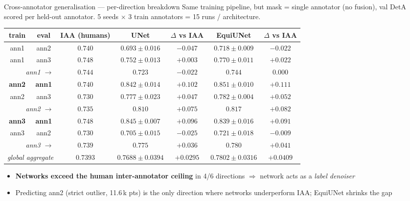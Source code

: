 \documentclass[10pt,aspectratio=169]{beamer}
\newcommand{\hilite}[1]{\textbf{\color{blue!60!black}#1}}
\begin{document}
\begin{frame}{Cross-annotator generalisation --- per-direction breakdown}
  Same training pipeline, but mask = single annotator (no fusion), val DetA scored
  per held-out annotator. 5 seeds $\times$ 3 train annotators = 15 runs / architecture.

  \vspace{2mm}
  \centering
  \scriptsize
  \begin{tabular}{c c c c c c c}
    \toprule
    train     & eval      & IAA (humans) & UNet                  & $\Delta$ vs IAA & EquiUNet              & $\Delta$ vs IAA \\
    \midrule
    ann1      & ann2      & $0.740$ & $0.693 \pm 0.016$           & $-0.047$        & $0.718 \pm 0.009$     & $-0.022$        \\
    ann1      & ann3      & $0.748$ & $0.752 \pm 0.013$           & $+0.003$        & $0.770 \pm 0.011$     & $+0.022$        \\
    \multicolumn{2}{r}{\emph{ann1 $\to$}} & $0.744$ & $0.723$ & $-0.022$ & $0.744$ & $0.000$ \\
    \midrule
    \hilite{ann2} & \hilite{ann1} & $0.740$ & \hilite{$0.842 \pm 0.014$} & \hilite{$+0.102$} & \hilite{$0.851 \pm 0.010$} & \hilite{$+0.111$} \\
    ann2      & ann3      & $0.730$ & $0.777 \pm 0.023$           & $+0.047$        & $0.782 \pm 0.004$     & $+0.052$        \\
    \multicolumn{2}{r}{\emph{ann2 $\to$}} & $0.735$ & \hilite{$0.810$} & \hilite{$+0.075$} & \hilite{$0.817$} & \hilite{$+0.082$} \\
    \midrule
    \hilite{ann3} & \hilite{ann1} & $0.748$ & \hilite{$0.845 \pm 0.007$} & \hilite{$+0.096$} & $0.839 \pm 0.016$ & $+0.091$        \\
    ann3      & ann2      & $0.730$ & $0.705 \pm 0.015$           & $-0.025$        & $0.721 \pm 0.018$     & $-0.009$        \\
    \multicolumn{2}{r}{\emph{ann3 $\to$}} & $0.739$ & $0.775$ & $+0.036$ & $0.780$ & $+0.041$ \\
    \midrule
    \multicolumn{2}{r}{\emph{global aggregate}} & $0.7393$ & $0.7688 \pm 0.0394$ & $+0.0295$ & \hilite{$0.7802 \pm 0.0316$} & \hilite{$+0.0409$} \\
    \bottomrule
  \end{tabular}
  \normalsize

  \vspace{2mm}
  \begin{itemize}\setlength\itemsep{1pt}
    \item \hilite{Networks exceed the human inter-annotator ceiling} in 4/6 directions
          $\Rightarrow$ network acts as a \emph{label denoiser}
    \item Predicting ann2 (strict outlier, 11.6\,k pts) is the only direction where
          networks underperform IAA; EquiUNet shrinks the gap
  \end{itemize}
\end{frame}
\end{document}
